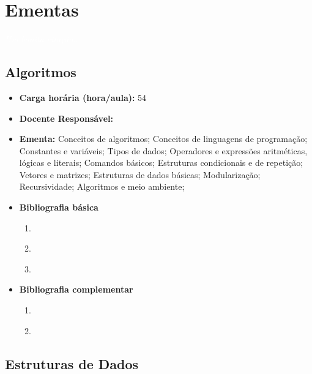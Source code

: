 \documentclass[11pt,fleqn]{book} %
\begin{document}
\chapter{Ementas}\label{ementas}
\vspace{6em}
\begin{flushright}
	\textit{\textcolor{white}{Um bonita citação...}}
\end{flushright}
\vspace{12em}


\newpage
\section{Algoritmos}\label{disc:algoritmos}

\begin{itemize}
	\item \textbf{Carga horária (hora/aula):} 54
	\item \textbf{Docente Responsável:}~
	\item \textbf{Ementa:} 
	Conceitos de algoritmos;
	Conceitos de linguagens de programação;
	Constantes e variáveis;
	Tipos de dados;
	Operadores e expressões aritméticas, lógicas e literais; 
	Comandos básicos;
	Estruturas condicionais e de repetição;
	Vetores e matrizes;
	Estruturas de dados básicas;
	Modularização;
	Recursividade;
	Algoritmos e meio ambiente;
	\item \textbf{Bibliografia básica}
	\begin{enumerate}
		\item \cite{cormen2002algoritmos}
		\item \cite{silva2007estrutura}
		\item \cite{szwarcfiter1994estruturas}
	\end{enumerate}
	\item \textbf{Bibliografia complementar}
	\begin{enumerate}
		\item \cite{ascencio2010estruturas}
		\item \cite{lafore2004estruturas}
	\end{enumerate}	
\end{itemize}



\newpage
\section{Estruturas de Dados}\label{disc:estruturadedados}
\end{document}
